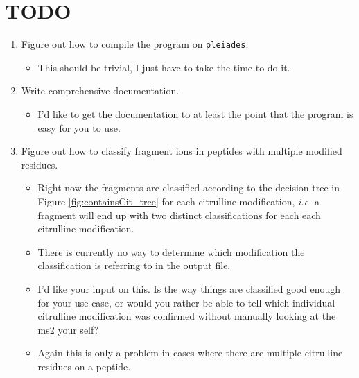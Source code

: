 \documentclass[12pt]{article}
\begin{document}
	

	\section{TODO} %
	\label{sec:todo}

	\begin{enumerate}

		\item Figure out how to compile the program on \texttt{pleiades}. 
		\begin{itemize}
			\item This should be trivial, I just have to take the time to do it.
		\end{itemize}

		\item Write comprehensive documentation.
		\begin{itemize}
			\item I'd like to get the documentation to at least the point that the program is easy for you to use.
		\end{itemize}

		\item Figure out how to classify fragment ions in peptides with multiple modified residues.
		\begin{itemize}
			\item Right now the fragments are classified according to the decision tree in Figure \ref{fig:containsCit_tree} for each citrulline modification, \textit{i.e.} a fragment will end up with two distinct classifications for each each citrulline modification.  
			\item There is currently no way to determine which modification the classification is referring to in the output file.
			\item I'd like your input on this. Is the way things are classified good enough for your use case, or would you rather be able to tell which individual citrulline modification was confirmed without manually looking at the ms2 your self?
			\item Again this is only a problem in cases where there are multiple citrulline residues on a peptide.
		\end{itemize}		

	\end{enumerate}

\end{document}
